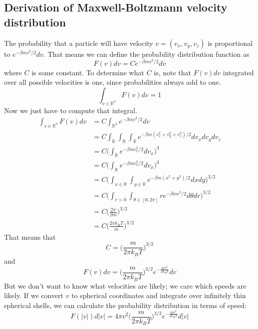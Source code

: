 \documentclass[12pt]{article}
\begin{document}
\subsection{Derivation of Maxwell-Boltzmann velocity distribution}
The probability that a particle will have velocity $v = (v_x, v_y, v_z)$ is proportional to $e^{- \beta m v^2 / 2} dv$. That means we can define the probability distribution function as
\[F(v) dv = C e^{- \beta m v^2 / 2} dv\]
where $C$ is some constant. To determine what $C$ is, note that $F(v) dv$ integrated over all possible velocities is one, since probabilities always add to one.
\[\int_{v \in \mathbb{R}^3} F(v) dv = 1 \]
Now we just have to compute that integral.
\begin{align*}
    \int_{v \in \mathbb{R}^3} F(v) dv &= C \int_{\mathbb{R}^3} e^{- \beta m v^2 / 2} dv \\
    &= C \int_{\mathbb{R}} \int_{\mathbb{R}} \int_{\mathbb{R}} e^{- \beta m (v_x^2 + v_y^2 + v_z^2) / 2} dv_x dv_y dv_z \\
    &= C \Bigg( \int_{\mathbb{R}} e^{- \beta m v_x^2 / 2} dv_x \Bigg)^3 \\
    &= C \Bigg( \int_{\mathbb{R}} e^{- \beta m v_x^2 / 2} dv_x \Bigg)^3 \\
    &= C \Bigg( \int_{x \in \mathbb{R}} \int_{y \in \mathbb{R}} e^{- \beta m (x^2 + y^2) / 2} dx dy \Bigg)^{3/2} \\
    &= C \Bigg( \int_{r>0} \int_{\theta \in [0, 2\pi]} r e^{- \beta m r^2 / 2} d\theta dr \Bigg)^{3/2} \\
    &= C \Big( \frac{2 \pi}{\beta m} \Big)^{3/2} \\
    &= C \Big( \frac{2 \pi k_B T}{m} \Big)^{3/2}
\end{align*}
That means that
\[C = \Big( \frac{m}{2 \pi k_B T} \Big)^{3/2}\]
and
\[F(v) dv = \Big( \frac{m}{2 \pi k_B T} \Big)^{3/2} e^{-\frac{m v^2}{2 k_B T}} dv\]
But we don't want to know what velocities are likely; we care which speeds are likely. If we convert $v$ to spherical coordinates and integrate over infinitely thin spherical shells, we can calculate the probability distribution in terms of speed:
\[F(|v|) d|v| = 4 \pi v^2 \Big( \frac{m}{2 \pi k_B T} \Big)^{3/2} e^{-\frac{m v^2}{2 k_B T}} d|v|\]
\end{document}
